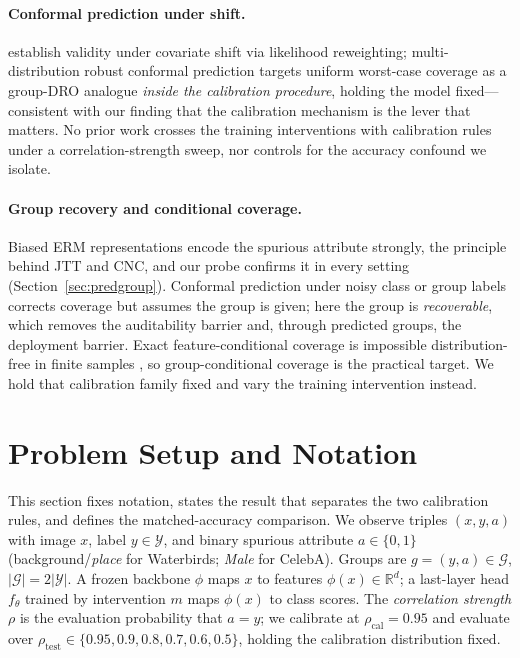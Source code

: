 \documentclass[pdflatex,sn-basic]{sn-jnl}%
\theoremstyle{thmstyleone}%
\newcommand{\rhocal}{\rho_{\mathrm{cal}}}
\newcommand{\rhotest}{\rho_{\mathrm{test}}}
\begin{document}
\paragraph{Conformal prediction under shift.}
\citet{tibshirani2019} establish validity under covariate shift via likelihood
reweighting; multi-distribution robust conformal prediction \citep{mdcp2026}
targets uniform worst-case coverage as a group-DRO analogue \emph{inside the
calibration procedure}, holding the model fixed---consistent with our finding that
the calibration mechanism is the lever that matters. No prior work crosses the
training interventions with calibration rules under a correlation-strength
sweep, nor controls for the accuracy confound we isolate.



\paragraph{Group recovery and conditional coverage.} Biased ERM representations encode the
spurious attribute strongly, the principle behind JTT and CNC, and our probe confirms it in every
setting (Section~\ref{sec:predgroup}). Conformal prediction under noisy class or group labels
\citep{einbinder2022,sesia2023noisy} corrects coverage but assumes the group is given; here the
group is \emph{recoverable}, which removes the auditability barrier and, through predicted groups,
the deployment barrier. Exact feature-conditional coverage is impossible distribution-free in finite
samples \citep{lei2014distribution,barber2021limits}, so group-conditional coverage is the practical
target. We hold that calibration family fixed and vary the training intervention instead.

\section{Problem Setup and Notation}
\label{sec:setup}

This section fixes notation, states the result that separates the two calibration rules, and
defines the matched-accuracy comparison. We observe triples $(x,y,a)$ with image $x$, label $y\in\mathcal{Y}$, and binary
spurious attribute $a\in\{0,1\}$ (background/\emph{place} for Waterbirds;
\emph{Male} for CelebA). Groups are $g=(y,a)\in\mathcal{G}$,
$|\mathcal{G}|=2|\mathcal{Y}|$. A frozen backbone $\phi$ maps $x$ to features
$\phi(x)\in\mathbb{R}^d$; a last-layer head $f_\theta$ trained by intervention $m$
maps $\phi(x)$ to class scores. The \emph{correlation strength} $\rho$ is the
evaluation probability that $a=y$; we
calibrate at $\rhocal=0.95$ and evaluate over
$\rhotest\in\{0.95,0.9,0.8,0.7,0.6,0.5\}$, holding the calibration distribution
fixed.
\end{document}

